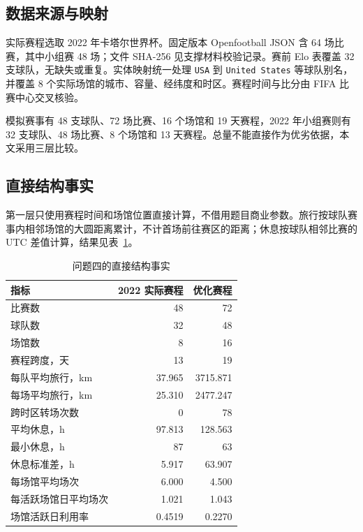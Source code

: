 \subsection{数据来源与映射}

实际赛程选取 2022 年卡塔尔世界杯。固定版本 Openfootball JSON 含 64 场比赛，其中小组赛 48 场\cite{openfootball2022}；文件 SHA-256 见支撑材料校验记录。赛前 Elo 表覆盖 32 支球队，无缺失或重复\cite{elo2022}。实体映射统一处理 \texttt{USA} 到 \texttt{United\ States} 等球队别名，并覆盖 8 个实际场馆的城市、容量、经纬度和时区。赛程时间与比分由 FIFA 比赛中心交叉核验\cite{fifa2022}。

模拟赛事有 48 支球队、72 场比赛、16 个场馆和 19 天赛程，2022 年小组赛则有 32 支球队、48 场比赛、8 个场馆和 13 天赛程。总量不能直接作为优劣依据，本文采用三层比较。

\subsection{直接结构事实}

第一层只使用赛程时间和场馆位置直接计算，不借用题目商业参数。旅行按球队赛事内相邻场馆的大圆距离累计，不计首场前往赛区的距离；休息按球队相邻比赛的 UTC 差值计算，结果见表~\ref{tab:q4-structure}。

\begin{table}[htbp]
\centering
\caption{问题四的直接结构事实}\label{tab:q4-structure}
\small
\begin{tabular}{lrr}
\toprule
指标 & 2022 实际赛程 & 优化赛程 \\
\midrule
比赛数 & 48 & 72 \\
球队数 & 32 & 48 \\
场馆数 & 8 & 16 \\
赛程跨度，天 & 13 & 19 \\
每队平均旅行，km & 37.965 & 3715.871 \\
每场平均旅行，km & 25.310 & 2477.247 \\
跨时区转场次数 & 0 & 78 \\
平均休息，h & 97.813 & 128.563 \\
最小休息，h & 87 & 63 \\
休息标准差，h & 5.917 & 63.907 \\
每场馆平均场次 & 6.000 & 4.500 \\
每活跃场馆日平均场次 & 1.021 & 1.043 \\
场馆活跃日利用率 & 0.4519 & 0.2270 \\
\bottomrule
\end{tabular}
\end{table}

